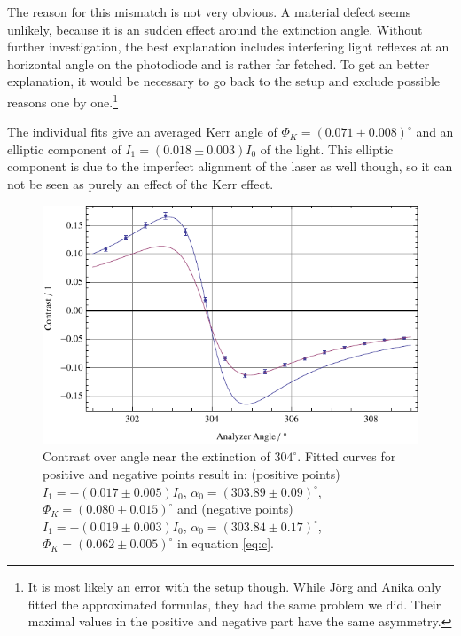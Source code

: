 \documentclass[a4paper]{scrartcl}
\numberwithin{equation}{section}
\numberwithin{figure}{section}
\numberwithin{table}{section}
\begin{document}
The reason for this mismatch is not very obvious. A material defect seems unlikely, because it is an sudden effect around the extinction angle. Without further investigation, the best explanation includes interfering light reflexes at an horizontal angle on the photodiode and is rather far fetched. To get an better explanation, it would be necessary to go back to the setup and exclude possible reasons one by one.\footnote{It is most likely an error with the setup though. While J\"org and Anika only fitted the approximated formulas, they had the same problem we did. Their maximal values in the positive and negative part have the same asymmetry.}

The individual fits give an averaged Kerr angle of $\Phi_K = (0.071\pm0.008)^\circ$ and an elliptic component of $I_1=(0.018\pm0.003)I_0$ of the light. This elliptic component is due to the imperfect alignment of the laser as well though, so it can not be seen as purely an effect of the Kerr effect.

\begin{figure} 
 \centering
         \includegraphics[width=0.45\linewidth]{img/kerr.pdf}
\caption{
\small Contrast over angle near the extinction of $304^\circ$. Fitted curves for positive and negative points result in: (positive points) $I_1 = -(0.017\pm0.005)I_0$, $\alpha_0=(303.89\pm 0.09)^\circ$, $\Phi_K=(0.080\pm0.015)^\circ$ and (negative points) $I_1 = -(0.019\pm0.003)I_0$, $\alpha_0=(303.84\pm 0.17)^\circ$, $\Phi_K=(0.062\pm0.005)^\circ$ in equation \ref{eq:c}. } 
	\label{fig:kerrangle}
\end{figure}
\end{document}
